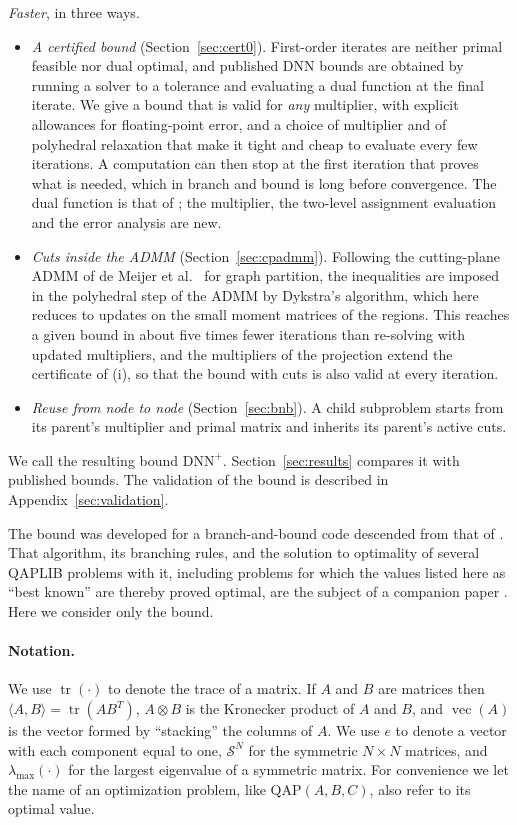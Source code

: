 \documentclass[11pt]{article}
\theoremstyle{remark}
\newcommand{\Sym}{\mathcal{S}}
\newcommand{\tr}{\operatorname{tr}}
\newcommand{\vecop}{\operatorname{vec}}
\newcommand{\inner}[2]{\langle #1, #2\rangle}
\newcommand{\lmax}{\lambda_{\max}}
\newcommand{\DNNp}{\mathrm{DNN}^{+}}
\begin{document}
\emph{Faster}, in three ways.
\begin{itemize}
\item[(i)] \emph{A certified bound} (Section~\ref{sec:cert0}). First-order
  iterates are neither primal feasible nor dual optimal, and published DNN
  bounds are obtained by running a solver to a tolerance and evaluating a dual
  function at the final iterate. We give a bound that is valid for \emph{any}
  multiplier, with explicit allowances for floating-point error, and a choice
  of multiplier and of polyhedral relaxation that make it tight and cheap to
  evaluate every few iterations. A computation can then stop at the first
  iteration that proves what is needed, which in branch and bound is long
  before convergence. The dual function is that of \cite{graham}; the
  multiplier, the two-level assignment evaluation and the error analysis are
  new.
\item[(ii)] \emph{Cuts inside the ADMM} (Section~\ref{sec:cpadmm}). Following
  the cutting-plane ADMM of de Meijer et al.\ \cite{dmswz} for graph partition,
  the inequalities are imposed in the polyhedral step of the ADMM by Dykstra's
  algorithm, which here reduces to updates on the small moment matrices of the
  regions. This reaches a given bound in about five times fewer iterations than
  re-solving with updated multipliers, and the multipliers of the projection
  extend the certificate of (i), so that the bound with cuts is also valid at
  every iteration.
\item[(iii)] \emph{Reuse from node to node} (Section~\ref{sec:bnb}). A child
  subproblem starts from its parent's multiplier and primal matrix and inherits
  its parent's active cuts.
\end{itemize}
We call the resulting bound $\DNNp$. Section~\ref{sec:results} compares it with
published bounds. The validation of the
bound is described in Appendix~\ref{sec:validation}.

The bound was developed for a branch-and-bound code descended from that of
\cite{ba01,abgl}. That algorithm, its branching rules, and the solution to
optimality of several QAPLIB problems with it, including problems for which the
values listed here as ``best known'' are thereby proved optimal, are the subject
of a companion paper \cite{companion}. Here we consider only the bound.

\paragraph{Notation.} We use $\tr(\cdot)$ to denote the trace of a matrix. If $A$
and $B$ are matrices then $\inner{A}{B} = \tr(AB^T)$, $A\otimes B$ is the Kronecker
product of $A$ and $B$, and $\vecop(A)$ is the vector formed by ``stacking'' the
columns of $A$. We use $e$ to denote a vector with each component equal to one,
$\Sym^N$ for the symmetric $N\times N$ matrices, and $\lmax(\cdot)$ for the largest
eigenvalue of a symmetric matrix. For convenience we let the name of an
optimization problem, like $\mathrm{QAP}(A,B,C)$, also refer to its optimal value.
\end{document}
